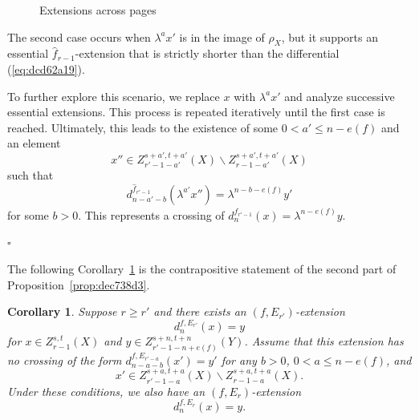 \documentclass[12pt,a4paper]{article}
\renewenvironment{proof}{{\noindent\it\textbf{Proof}}\quad\it}{\hfill$\square$}
\newtheorem{corollary}[equation]{Corollary}
\newcommand{\drawarrow}{\draw[-{Stealth[length=1.5mm]}, shorten >=(0.08cm)]}
\begin{document}
\begin{sloppy}
\begin{proof}
\begin{figure}[h]
{}
    \caption{Extensions across pages}\label{fig:b22d961f}
    \end{figure}

    The second case occurs when $\lambda^ax'$ is in the image of $\rho_X$, but it supports an essential $\hat f_{r-1}$-extension that is strictly shorter than the differential (\ref{eq:dcd62a19}).

    To further explore this scenario, we replace $x$ with $\lambda^ax'$ and analyze successive essential extensions. This process is repeated iteratively until the first case is reached. Ultimately, this leads to the existence of some $0<a'\le n-e(f)$ and an element
    $$x''\in Z_{r'-1-a'}^{s+a',t+a'}(X)\backslash Z_{r-1-a'}^{s+a',t+a'}(X)$$
    such that
    $$d^{\hat f_{r'-1}}_{n-a'-b}(\lambda^{a'} x'')=\lambda^{n-b-e(f)} y'$$
    for some $b>0$. This represents a crossing of $d^{\hat f_{r'-1}}_n(x)=\lambda^{n-e(f)}y$.

\end{proof}


The following Corollary~\ref{cor:dfc6043e} is the contrapositive statement of the second part of Proposition~\ref{prop:dec738d3}.


\begin{corollary}\label{cor:dfc6043e}
    Suppose $r\ge r'$ and there exists an $(f,E_{r'})$-extension
    $$d^{f,E_{r'}}_n(x)=y$$
    for $x\in Z_{r-1}^{s,t}(X)$ and $y\in Z_{r'-1-n+e(f)}^{s+n,t+n}(Y)$. Assume that this extension has no crossing of the form $d^{f,E_{r'-a}}_{n-a-b}(x')=y'$ for any $b>0$, $0<a\le n-e(f)$, and
    $$x'\in Z_{r'-1-a}^{s+a,t+a}(X)\backslash Z_{r-1-a}^{s+a,t+a}(X).$$
    Under these conditions, we also have an $(f,E_{r})$-extension
    $$d^{f,E_{r}}_n(x)=y.$$
\end{corollary}

\end{sloppy}
\end{document}
